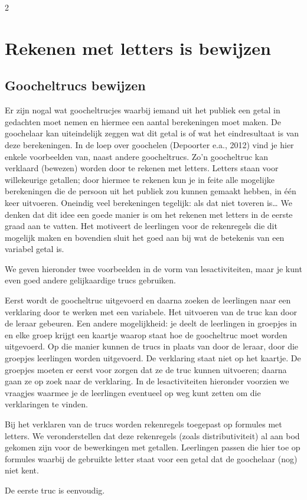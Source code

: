 \begin{multicols}{2}
\section{Rekenen met letters is bewijzen}
\subsection{Goocheltrucs bewijzen}
Er zijn nogal wat goocheltrucjes waarbij iemand uit het publiek een getal in gedachten moet nemen en hiermee een aantal berekeningen moet maken. De goochelaar kan uiteindelijk zeggen wat dit getal is of wat het eindresultaat is van deze berekeningen. In de loep over goochelen (Depoorter e.a., 2012) vind je hier enkele voorbeelden van, naast andere goocheltrucs. Zo’n goocheltruc kan verklaard (bewezen) worden door te rekenen met letters. Letters staan voor willekeurige getallen; door hiermee te rekenen kun je in feite alle mogelijke berekeningen die de persoon uit het publiek zou kunnen gemaakt hebben, in één keer uitvoeren. Oneindig veel berekeningen tegelijk: als dat niet toveren is… We denken dat dit idee een goede manier is om het rekenen met letters in de eerste graad aan te vatten. Het motiveert de leerlingen voor de rekenregels die dit mogelijk maken en bovendien sluit het goed aan bij wat de betekenis van een variabel getal is.

We geven hieronder twee voorbeelden in de vorm van lesactiviteiten, maar je kunt even goed andere gelijkaardige trucs gebruiken. 

Eerst wordt de goocheltruc uitgevoerd en daarna zoeken de leerlingen naar een verklaring door te werken met een variabele. Het uitvoeren van de truc kan door de leraar gebeuren. Een andere mogelijkheid: je deelt de leerlingen in groepjes in en elke groep krijgt een kaartje waarop staat hoe de goocheltruc moet worden uitgevoerd. Op die manier kunnen de trucs in plaats van door de leraar, door die groepjes leerlingen worden uitgevoerd. De verklaring staat niet op het kaartje. De groepjes moeten er eerst voor zorgen dat ze de truc kunnen uitvoeren; daarna gaan ze op zoek naar de verklaring. In de lesactiviteiten hieronder voorzien we vraagjes waarmee je de leerlingen eventueel op weg kunt zetten om die verklaringen te vinden.

Bij het verklaren van de trucs worden rekenregels toegepast op formules met letters. We veronderstellen dat deze rekenregels (zoals distributiviteit) al aan bod gekomen zijn voor de bewerkingen met getallen. Leerlingen passen die hier toe op formules waarbij de gebruikte letter staat voor een getal dat de goochelaar (nog) niet kent.

De eerste truc is eenvoudig.

\end{multicols}

